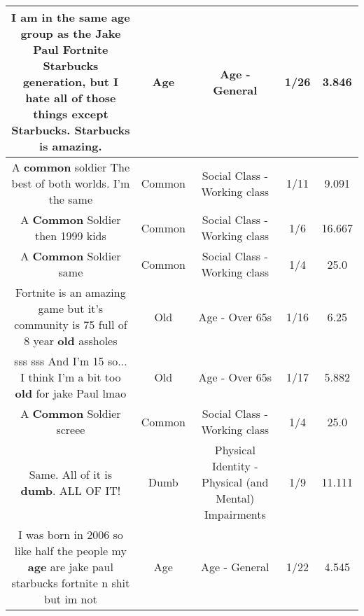 \documentclass[11pt]{article}
\newlength\mylength
\begin{document}
\begin{center}
\begin{longtable}{|C{.65\mylength}|C{.30\mylength}|C{.12\mylength}|C{.12\mylength}|C{.12\mylength}|}
  \small I am in the same \textbf{age} group as the Jake Paul Fortnite Starbucks generation, but I hate all of those things except Starbucks. Starbucks is amazing.\normalsize   & Age & Age - General & 1/26 & 3.846 \\  \hline
  \small A \textbf{common} soldier The best of both worlds. I'm the same\normalsize   & Common & Social Class - Working class & 1/11 & 9.091 \\  \hline
  \small A \textbf{Common} Soldier then 1999 kids\normalsize   & Common & Social Class - Working class & 1/6 & 16.667 \\  \hline
  \small A \textbf{Common} Soldier same\normalsize   & Common & Social Class - Working class & 1/4 & 25.0 \\  \hline
  \small Fortnite is an amazing game but it's community is 75 full of 8 year \textbf{old} assholes\normalsize   & Old & Age - Over 65s & 1/16 & 6.25 \\  \hline
  \small sss sss And I'm 15 so... I think I'm a bit too \textbf{old} for jake Paul lmao\normalsize   & Old & Age - Over 65s & 1/17 & 5.882 \\  \hline
  \small A \textbf{Common} Soldier screee\normalsize   & Common & Social Class - Working class & 1/4 & 25.0 \\  \hline
  \small Same. All of it is \textbf{dumb}. ALL OF IT!\normalsize   & Dumb & Physical Identity - Physical (and Mental) Impairments & 1/9 & 11.111 \\  \hline
  \small I was born in 2006 so like half the people my \textbf{age} are jake paul starbucks fortnite n shit but im not\normalsize   & Age & Age - General & 1/22 & 4.545 \\  \hline

\end{longtable}
\end{center}
\end{document}
